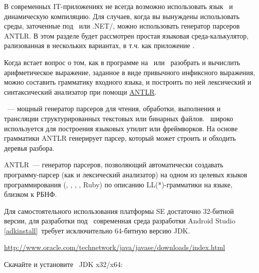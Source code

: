 \secdown

В современных IT-приложениях не всегда возможно использовать язык
\cpp\ и динамическую компиляцию. Для случаев, когда вы вынуждены использовать
среды, заточенные под \java\ или .NET/\cs, можно использовать генератор 
парсеров ANTLR. В этом разделе будет рассмотрен простая языковая 
среда-калькулятор, рализованная в нескольких вариантах, в т.ч. как приложение
\andr.


Когда встает вопрос о том, как в программе на \java\ или \cs\ разобрать и 
вычислить арифметическое выражение, заданное в
виде привычного инфиксного выражения, можно составить грамматику 
входного языка, и построить по ней лексический и синтаксический 
анализатор при помощи \href{http://www.antlr.org/}{ANTLR}.

\begin{framed}
\ --- мощный генератор
парсеров для чтения, обработки, выполнения и трансляции
структурированных текстовых или бинарных файлов. \ широко 
используется для построения языковых утилит или фреймворков. На основе 
грамматики ANTLR генерирует парсер, который может строить и обходить 
деревья разбора.
\end{framed}

ANTLR\ --- генератор парсеров, позволяющий автоматически создавать
программу-парсер (как и лексический анализатор) на одном из целевых языков
программирования (\cpp, \java, \cs, \py, Ruby) по описанию LL(*)-грамматики 
на языке, близком к РБНФ.

\secdown


Для самостоятельного использования платформы \java SE достаточно
32-битной версии, для разработки под \andr\ современная среда разработки Android 
Studio \ref{adkinstall}\ требует исключительно 64-битную версию JDK.

\bigskip
\url{http://www.oracle.com/technetwork/java/javase/downloads/index.html}
\bigskip

Скачайте и установите \java\ JDK x32/x64:





